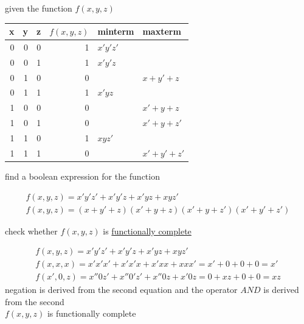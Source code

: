 \documentclass[a4paper,12pt]{article}
\begin{document}
\newenvironment{note}
  {\begin{bclogo}[logo=\bcinfo, couleurBarre=orange, couleur=lightgray]{ note}}
  {\end{bclogo}}
\newenvironment{attention}
  {\begin{bclogo}[logo=\bcattention, couleurBarre=red, noborder=true, 
                couleur=red!15]{Important!}}
  {\end{bclogo}}

\begin{question}
given the function \(f(x,y,z)\)\\[0pt]
\begin{center}
\begin{tabular}{rrrrll}
x & y & z & \(f(x,y,z)\) & minterm & maxterm\\[0pt]
\hline
0 & 0 & 0 & 1 & \(x'y'z'\) & \\[0pt]
0 & 0 & 1 & 1 & \(x'y'z\) & \\[0pt]
0 & 1 & 0 & 0 &  & \(x+y'+z\)\\[0pt]
0 & 1 & 1 & 1 & \(x'yz\) & \\[0pt]
1 & 0 & 0 & 0 &  & \(x'+y+z\)\\[0pt]
1 & 0 & 1 & 0 &  & \(x'+y+z'\)\\[0pt]
1 & 1 & 0 & 1 & \(xyz'\) & \\[0pt]
1 & 1 & 1 & 0 &  & \(x'+y'+z'\)\\[0pt]
\end{tabular}
\end{center}
\begin{subquestion}
find a boolean expression for the function\\[0pt]
\begin{answer}
\begin{gather*}
  f(x,y,z) = x'y'z'+x'y'z+x'yz+xyz'\\
  f(x,y,z) = (x+y'+z)(x'+y+z)(x'+y+z')(x'+y'+z')
\end{gather*}
\end{answer}
\end{subquestion}
\begin{subquestion}
check whether \(f(x,y,z)\) is \href{boolean_algebra.org}{functionally complete}\\[0pt]
\begin{answer}
\begin{gather*}
  f(x,y,z) = x'y'z'+x'y'z+x'yz+xyz'\\
  f(x,x,x) = x'x'x' + x'x'x + x'xx + xxx' = x' + 0 + 0 + 0 = x'\\
  f(x',0,z) = x''0z' + x''0'z' + x''0z + x'0z = 0 + xz + 0 + 0 = xz
\end{gather*}
negation is derived from the second equation and the operator \(AND\) is derived from the second\\[0pt]
\(f(x,y,z)\) is functionally complete\\[0pt]
\end{answer}
\end{subquestion}
\end{question}
\end{document}
